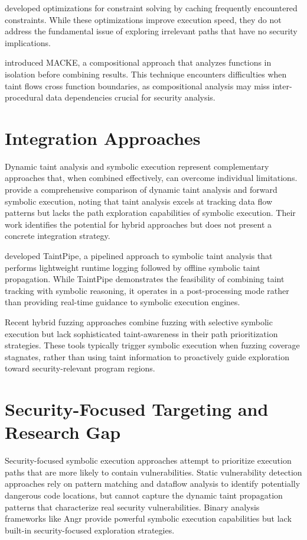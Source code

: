 \citet{poeplau_symbolic_2020} developed optimizations for constraint solving by caching frequently encountered constraints. While these optimizations improve execution speed, they do not address the fundamental issue of exploring irrelevant paths that have no security implications.

\citet{ognawala_macke_2016} introduced MACKE, a compositional approach that analyzes functions in isolation before combining results. This technique encounters difficulties when taint flows cross function boundaries, as compositional analysis may miss inter-procedural data dependencies crucial for security analysis.

\section{Integration Approaches}

Dynamic taint analysis and symbolic execution represent complementary approaches that, when combined effectively, can overcome individual limitations. \citet{schwartz_all_2010} provide a comprehensive comparison of dynamic taint analysis and forward symbolic execution, noting that taint analysis excels at tracking data flow patterns but lacks the path exploration capabilities of symbolic execution. Their work identifies the potential for hybrid approaches but does not present a concrete integration strategy.

\citet{ming_taintpipe_2015} developed TaintPipe, a pipelined approach to symbolic taint analysis that performs lightweight runtime logging followed by offline symbolic taint propagation. While TaintPipe demonstrates the feasibility of combining taint tracking with symbolic reasoning, it operates in a post-processing mode rather than providing real-time guidance to symbolic execution engines.

Recent hybrid fuzzing approaches combine fuzzing with selective symbolic execution but lack sophisticated taint-awareness in their path prioritization strategies. These tools typically trigger symbolic execution when fuzzing coverage stagnates, rather than using taint information to proactively guide exploration toward security-relevant program regions.

\section{Security-Focused Targeting and Research Gap}

Security-focused symbolic execution approaches attempt to prioritize execution paths that are more likely to contain vulnerabilities. Static vulnerability detection approaches rely on pattern matching and dataflow analysis to identify potentially dangerous code locations, but cannot capture the dynamic taint propagation patterns that characterize real security vulnerabilities. Binary analysis frameworks like Angr \cite{shoshitaishvili_sok_2016} provide powerful symbolic execution capabilities but lack built-in security-focused exploration strategies.


